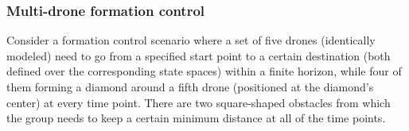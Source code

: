 \subsubsection{Multi-drone formation control}
\label{subsec:formation_control}
Consider a formation control scenario where a set of five drones (identically modeled) need to go from a specified start point to a certain destination (both defined over the corresponding state spaces) within a finite horizon, while four of them forming a diamond around a fifth drone (positioned at the diamond's center) at every time point. There are two square-shaped obstacles from which the group needs to keep a certain minimum distance at all of the time points. %

